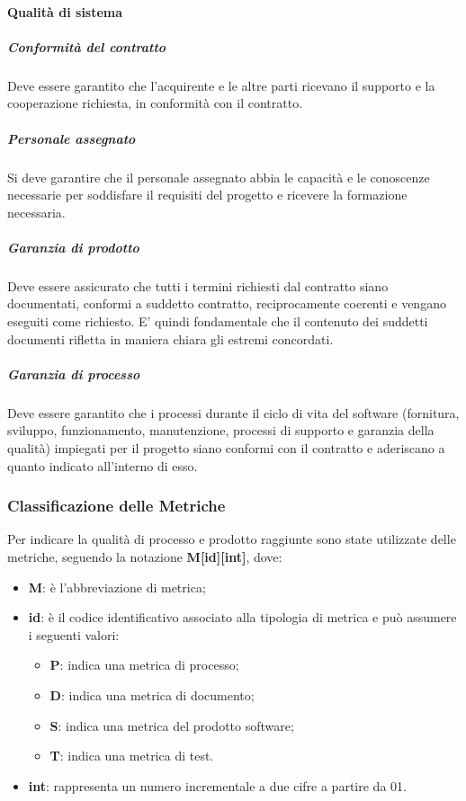 		\paragraph{Qualità di sistema}
			\subparagraph{Conformità del contratto}
			Deve essere garantito che l'acquirente e le altre parti ricevano il supporto e la cooperazione richiesta, in conformità con il contratto.
			
			\subparagraph{Personale assegnato}
			Si deve garantire che il personale assegnato abbia le capacità e le conoscenze necessarie per soddisfare il requisiti del progetto e ricevere la formazione necessaria.
			
			\subparagraph{Garanzia di prodotto}
			Deve essere assicurato che tutti i termini richiesti dal contratto siano documentati, conformi a suddetto contratto, reciprocamente coerenti e vengano eseguiti come richiesto. E' quindi fondamentale che il contenuto dei suddetti documenti rifletta in maniera chiara gli estremi concordati.
			
			\subparagraph{Garanzia di processo}
			Deve essere garantito che i processi durante il ciclo di vita del software (fornitura, sviluppo, funzionamento, manutenzione, processi di supporto e garanzia della qualità) impiegati per il progetto siano conformi con il contratto e aderiscano a quanto indicato all'interno di esso.
					
	\subsubsection{Classificazione delle Metriche}
	Per indicare la qualità di processo e prodotto raggiunte sono state utilizzate delle metriche, seguendo la notazione \textbf{M[id][int]}, dove:
	\begin{itemize}					
		\item \textbf{M}: è l’abbreviazione di metrica;
		\item \textbf{id}: è il codice identificativo associato alla tipologia di metrica e può assumere i seguenti valori:
		\begin{itemize}
			\item \textbf{P}: indica una metrica di processo;
			\item \textbf{D}: indica una metrica di documento;
			\item \textbf{S}: indica una metrica del prodotto software;
			\item \textbf{T}: indica una metrica di test.
		\end{itemize}
		\item \textbf{int}: rappresenta un numero incrementale a due cifre a partire da 01.
	\end{itemize}